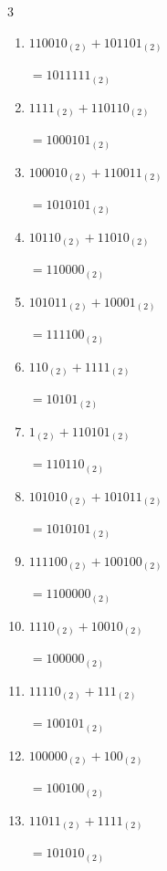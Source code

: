 \begin{multicols}{3}
\begin{enumerate}
        $=100110_{(2)}$

\columnbreak %

  \item $110010_{(2)} + 101101_{(2)}$

        $=1011111_{(2)}$

  \item $1111_{(2)} + 110110_{(2)}$

        $=1000101_{(2)}$

  \item $100010_{(2)} + 110011_{(2)}$

        $=1010101_{(2)}$

  \item $10110_{(2)} + 11010_{(2)}$

        $=110000_{(2)}$

  \item $101011_{(2)} + 10001_{(2)}$

        $=111100_{(2)}$

  \item $110_{(2)} + 1111_{(2)}$

        $=10101_{(2)}$

  \item $1_{(2)} + 110101_{(2)}$

        $=110110_{(2)}$

  \item $101010_{(2)} + 101011_{(2)}$

        $=1010101_{(2)}$

  \item $111100_{(2)} + 100100_{(2)}$

        $=1100000_{(2)}$

  \item $1110_{(2)} + 10010_{(2)}$

        $=100000_{(2)}$

\columnbreak %

\resetques

  \item $11110_{(2)} + 111_{(2)}$

        $=100101_{(2)}$

  \item $100000_{(2)} + 100_{(2)}$

        $=100100_{(2)}$

  \item $11011_{(2)} + 1111_{(2)}$

        $=101010_{(2)}$


\end{enumerate}
\end{multicols}
